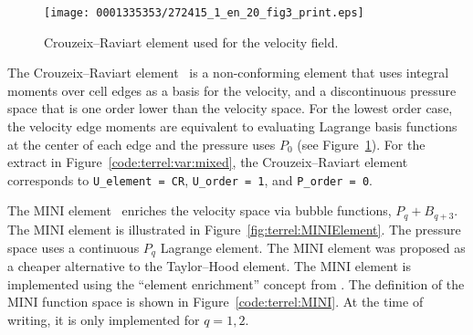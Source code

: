 \makeatletter
\def\img@cmode{\hskip-5pt\begin{turn}{90}\rlap{\kern1.5\p@\@img@cmode{\@cmodetext}}\end{turn}}
\makeatother

\begin{figure}[!t]
\bwfig
  \texttt{[image: 0001335353/272415\_1\_en\_20\_fig3\_print.eps]}
\caption{Crouzeix--Raviart element used for the velocity field.}
\label{fig:terrel:CRElements}\vspace*{-7pt}
\end{figure}


The Crouzeix--Raviart element~\citep{CrouzeixRaviart1973} is a
non-conforming element that uses integral \pagebreak moments over cell edges as
a basis for the velocity, and a discontinuous pressure space that is
one order lower than the velocity space.  For the lowest order case,
the velocity edge moments are equivalent to evaluating Lagrange
basis functions at the center of each edge and the pressure uses
$P_0$ (see Figure~\ref{fig:terrel:CRElements}).  For the extract
in Figure~\ref{code:terrel:var:mixed}, the Crouzeix--Raviart element
corresponds to {\tt U\_element = CR}, {\tt U\_order = 1},  and {\tt P\_order = 0}.
%


The MINI element~\citep{ArnoldBrezziFortin1984} enriches the velocity
space via bubble functions, $P_q + B_{q+3}$. The MINI element is
illustrated in Figure~\ref{fig:terrel:MINIElement}.  The pressure
space uses a continuous $P_{q}$ Lagrange element.  The MINI element
was proposed as a cheaper alternative to the Taylor--Hood element. The
MINI element is implemented using the ``element enrichment'' concept
from \ufl{}. The \ufl{} definition of the MINI function space is shown
in Figure~\ref{code:terrel:MINI}.  At the time of writing, it is only
implemented for $q=1, 2$.

\makeatletter
\def\@img@cmode#1{\begingroup\color{graytwf}\mkrule{\ifnarrow 32mm\else\the\cmode@text@wd\fi}
{\ifnarrow 26pt\else\the\cmode@text@ht\fi}{\z@}\endgroup%
\llap{\vbox to\cmode@text@ht{\vss\hbox to\cmode@text@wd{\hss\ifnarrow\hspace*{65pt}\vbox to 31pt{\hsize7pc\raggedright#1}\else#1\fi\hss}\vss}}}

\def\img@cmode{\hskip-5pt\begin{turn}{90}\rlap{\kern35\p@\@img@cmode{\@cmodetext}}\end{turn}}
\makeatother


